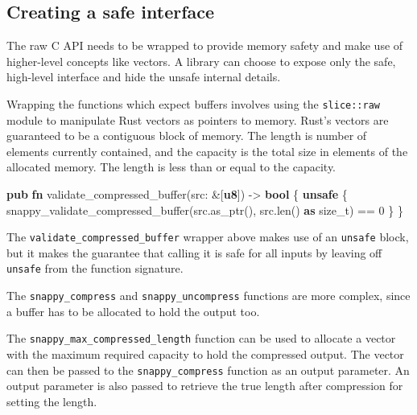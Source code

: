 \documentclass[a4paper,]{book}
\newenvironment{Shaded}{\begin{snugshade}}{\end{snugshade}}
\newcommand{\KeywordTok}[1]{\textcolor[rgb]{0.13,0.29,0.53}{\textbf{{#1}}}}
\newcommand{\DecValTok}[1]{\textcolor[rgb]{0.00,0.00,0.81}{{#1}}}
\newcommand{\NormalTok}[1]{{#1}}
\begin{document}
\subsection{Creating a safe interface}\label{creating-a-safe-interface}

The raw C API needs to be wrapped to provide memory safety and make use
of higher-level concepts like vectors. A library can choose to expose
only the safe, high-level interface and hide the unsafe internal
details.

Wrapping the functions which expect buffers involves using the
\texttt{slice::raw} module to manipulate Rust vectors as pointers to
memory. Rust's vectors are guaranteed to be a contiguous block of
memory. The length is number of elements currently contained, and the
capacity is the total size in elements of the allocated memory. The
length is less than or equal to the capacity.

\begin{Shaded}
\begin{Highlighting}[]
\KeywordTok{pub} \KeywordTok{fn} \NormalTok{validate_compressed_buffer(src: &[}\KeywordTok{u8}\NormalTok{]) -> }\KeywordTok{bool} \NormalTok{\{}
    \KeywordTok{unsafe} \NormalTok{\{}
        \NormalTok{snappy_validate_compressed_buffer(src.as_ptr(), src.len() }\KeywordTok{as} \NormalTok{size_t) == }\DecValTok{0}
    \NormalTok{\}}
\NormalTok{\}}
\end{Highlighting}
\end{Shaded}

The \texttt{validate\_compressed\_buffer} wrapper above makes use of an
\texttt{unsafe} block, but it makes the guarantee that calling it is
safe for all inputs by leaving off \texttt{unsafe} from the function
signature.

The \texttt{snappy\_compress} and \texttt{snappy\_uncompress} functions
are more complex, since a buffer has to be allocated to hold the output
too.

The \texttt{snappy\_max\_compressed\_length} function can be used to
allocate a vector with the maximum required capacity to hold the
compressed output. The vector can then be passed to the
\texttt{snappy\_compress} function as an output parameter. An output
parameter is also passed to retrieve the true length after compression
for setting the length.
\end{document}
